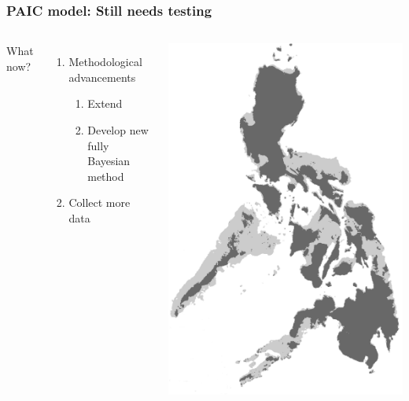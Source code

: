 \begin{frame}
    \frametitle{PAIC model: Still needs testing}
    \begin{columns}[c]
            What now? \\
            \begin{enumerate}
                \item Methodological advancements
                \begin{enumerate}
                    \item Extend \msb
                    \item Develop new fully Bayesian method
                \end{enumerate}
                \item Collect more data
            \end{enumerate}
            \includegraphics[width=\textwidth]{images/maps/Philippines.png}
    \end{columns}
\end{frame}

